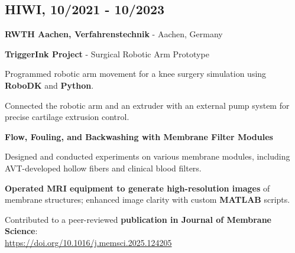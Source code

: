 \subsection*{HIWI, 10/2021 - 10/2023}
\textbf{RWTH Aachen, Verfahrenstechnik} - Aachen, Germany
\begin{highlights}
    \item \textbf{TriggerInk Project} - Surgical Robotic Arm Prototype
    \begin{highlights}
        \item Programmed robotic arm movement for a knee surgery simulation using \textbf{RoboDK} and \textbf{Python}.
        \item Connected the robotic arm and an extruder with an external pump system for precise cartilage extrusion control.
    \end{highlights}
    \item \textbf{Flow, Fouling, and Backwashing with Membrane Filter Modules}
    \begin{highlights}
        \item Designed and conducted experiments on various membrane modules, including AVT-developed hollow fibers and clinical blood filters.
        \item \textbf{Operated MRI equipment to generate high-resolution images} of membrane structures; enhanced image clarity with custom \textbf{MATLAB} scripts.
        \item Contributed to a peer-reviewed \textbf{publication in Journal of Membrane Science}: \\
        \href{https://doi.org/10.1016/j.memsci.2025.124205}{https://doi.org/10.1016/j.memsci.2025.124205}
    \end{highlights}
\end{highlights}
